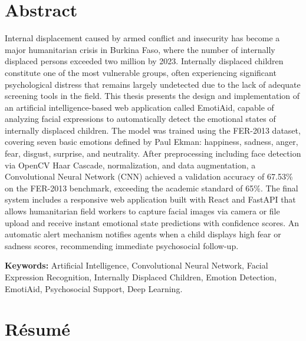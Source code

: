 \documentclass[a4paper,12pt,oneside]{report}
\begin{document}
\section*{Abstract}
\justifying

Internal displacement caused by armed conflict and insecurity has become a major
humanitarian crisis in Burkina Faso, where the number of internally displaced
persons exceeded two million by 2023. Internally displaced children constitute
one of the most vulnerable groups, often experiencing significant psychological
distress that remains largely undetected due to the lack of adequate screening
tools in the field. This thesis presents the design and implementation of an
artificial intelligence-based web application called EmotiAid, capable of
analyzing facial expressions to automatically detect the emotional states of
internally displaced children. The model was trained using the FER-2013 dataset,
covering seven basic emotions defined by Paul Ekman: happiness, sadness, anger,
fear, disgust, surprise, and neutrality. After preprocessing including face
detection via OpenCV Haar Cascade, normalization, and data augmentation, a
Convolutional Neural Network (CNN) achieved a validation accuracy of 67.53\%
on the FER-2013 benchmark, exceeding the academic standard of 65\%. The final
system includes a responsive web application built with React and FastAPI that
allows humanitarian field workers to capture facial images via camera or file
upload and receive instant emotional state predictions with confidence scores.
An automatic alert mechanism notifies agents when a child displays high fear or
sadness scores, recommending immediate psychosocial follow-up.

\vspace{0.5cm}
\textbf{Keywords:} Artificial Intelligence, Convolutional Neural Network,
Facial Expression Recognition, Internally Displaced Children, Emotion Detection,
EmotiAid, Psychosocial Support, Deep Learning.
\clearpage

\section*{R\'esum\'e}
\justifying
\end{document}
